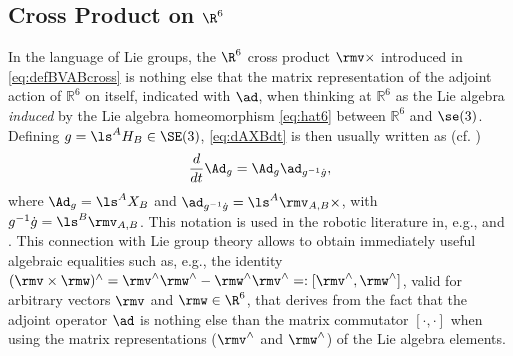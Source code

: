 \subsection{Cross Product on $\R^6$}
\label{subsec:crossProductAndLieGroups}
In the language of Lie groups, the $\R^6$ cross product $\rmv \times$ introduced in
\eqref{eq:defBVABcross}
is nothing else that the matrix representation of the adjoint action of
$\mathbb{R}^6$ on itself, indicated with $\ad$, when thinking at 
$\mathbb{R}^6$ as the Lie algebra 
{\em induced} by the Lie algebra homeomorphism
\eqref{eq:hat6}
between $\mathbb{R}^6$ and $\se(3)$.
Defining $g = \ls^AH_B \in \SE(3)$, \eqref{eq:dAXBdt}
is then usually written as (cf. \cite[Chapter 9, equation (9.3.4)]{marsden1999introduction})
\begin{align}\label{eq:dotAdg}
\frac{d}{dt} \Ad_g = \Ad_g \ad_{g^{-1}\dot g},
\end{align}
where $\Ad_g = \ls^AX_B$ and
$\ad_{g^{-1}\dot g} = \ls^A\rmv_{A,B}\times$,
with
$g^{-1}\dot g = \ls^B\rmv_{A,B}$.
This notation is used in the robotic literature in, e.g.,  \citep{garofalo2013closed} and \citep{park1995lie}. This connection
with Lie group theory allows to 
obtain immediately useful algebraic 
equalities such as, e.g., the identity 
$(\rmv \times \rmw)^\wedge = \rmv^\wedge \rmw^\wedge-\rmw^\wedge \rmv^\wedge =: [\rmv^\wedge, \rmw^\wedge]$, 
valid for arbitrary
vectors $\rmv$ and $\rmw \in \R^6$, 
that derives from the fact that the adjoint operator $\ad$ is nothing else than the matrix commutator $[\cdot,\cdot]$ when using
the matrix representations ($\rmv^\wedge$ and $\rmw^\wedge$) of the Lie algebra elements.

